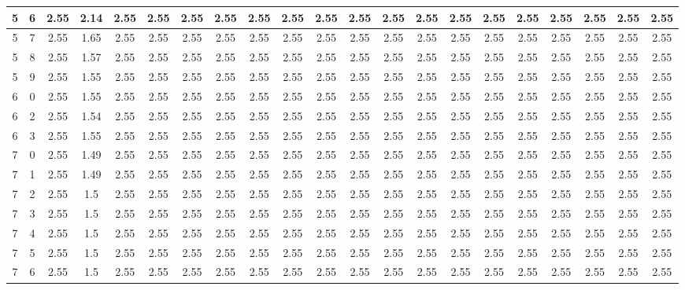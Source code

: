 \begin{landscape}
\begin{longtable}{|c|c||c||c|c|c|c|c|c|c|c|c||c|c|c|c|c|c|c|c|c|}
	5 & 6 & 2.55 & 2.14 & 2.55 & 2.55 & 2.55 & 2.55 & 2.55 & 2.55 & 2.55 & 2.55 & 2.55 & 2.55 & 2.55 & 2.55 & 2.55 & 2.55 & 2.55 & 2.55 & 2.55 \\ \hline
	5 & 7 & 2.55 & 1.65 & 2.55 & 2.55 & 2.55 & 2.55 & 2.55 & 2.55 & 2.55 & 2.55 & 2.55 & 2.55 & 2.55 & 2.55 & 2.55 & 2.55 & 2.55 & 2.55 & 2.55 \\ \hline
	5 & 8 & 2.55 & 1.57 & 2.55 & 2.55 & 2.55 & 2.55 & 2.55 & 2.55 & 2.55 & 2.55 & 2.55 & 2.55 & 2.55 & 2.55 & 2.55 & 2.55 & 2.55 & 2.55 & 2.55 \\ \hline
	5 & 9 & 2.55 & 1.55 & 2.55 & 2.55 & 2.55 & 2.55 & 2.55 & 2.55 & 2.55 & 2.55 & 2.55 & 2.55 & 2.55 & 2.55 & 2.55 & 2.55 & 2.55 & 2.55 & 2.55 \\ \hline
	6 & 0 & 2.55 & 1.55 & 2.55 & 2.55 & 2.55 & 2.55 & 2.55 & 2.55 & 2.55 & 2.55 & 2.55 & 2.55 & 2.55 & 2.55 & 2.55 & 2.55 & 2.55 & 2.55 & 2.55 \\ \hline
	6 & 2 & 2.55 & 1.54 & 2.55 & 2.55 & 2.55 & 2.55 & 2.55 & 2.55 & 2.55 & 2.55 & 2.55 & 2.55 & 2.55 & 2.55 & 2.55 & 2.55 & 2.55 & 2.55 & 2.55 \\ \hline
	6 & 3 & 2.55 & 1.55 & 2.55 & 2.55 & 2.55 & 2.55 & 2.55 & 2.55 & 2.55 & 2.55 & 2.55 & 2.55 & 2.55 & 2.55 & 2.55 & 2.55 & 2.55 & 2.55 & 2.55 \\ \hline
	7 & 0 & 2.55 & 1.49 & 2.55 & 2.55 & 2.55 & 2.55 & 2.55 & 2.55 & 2.55 & 2.55 & 2.55 & 2.55 & 2.55 & 2.55 & 2.55 & 2.55 & 2.55 & 2.55 & 2.55 \\ \hline
	7 & 1 & 2.55 & 1.49 & 2.55 & 2.55 & 2.55 & 2.55 & 2.55 & 2.55 & 2.55 & 2.55 & 2.55 & 2.55 & 2.55 & 2.55 & 2.55 & 2.55 & 2.55 & 2.55 & 2.55 \\ \hline
	7 & 2 & 2.55 & 1.5 & 2.55 & 2.55 & 2.55 & 2.55 & 2.55 & 2.55 & 2.55 & 2.55 & 2.55 & 2.55 & 2.55 & 2.55 & 2.55 & 2.55 & 2.55 & 2.55 & 2.55 \\ \hline
	7 & 3 & 2.55 & 1.5 & 2.55 & 2.55 & 2.55 & 2.55 & 2.55 & 2.55 & 2.55 & 2.55 & 2.55 & 2.55 & 2.55 & 2.55 & 2.55 & 2.55 & 2.55 & 2.55 & 2.55 \\ \hline
	7 & 4 & 2.55 & 1.5 & 2.55 & 2.55 & 2.55 & 2.55 & 2.55 & 2.55 & 2.55 & 2.55 & 2.55 & 2.55 & 2.55 & 2.55 & 2.55 & 2.55 & 2.55 & 2.55 & 2.55 \\ \hline
	7 & 5 & 2.55 & 1.5 & 2.55 & 2.55 & 2.55 & 2.55 & 2.55 & 2.55 & 2.55 & 2.55 & 2.55 & 2.55 & 2.55 & 2.55 & 2.55 & 2.55 & 2.55 & 2.55 & 2.55 \\ \hline
	7 & 6 & 2.55 & 1.5 & 2.55 & 2.55 & 2.55 & 2.55 & 2.55 & 2.55 & 2.55 & 2.55 & 2.55 & 2.55 & 2.55 & 2.55 & 2.55 & 2.55 & 2.55 & 2.55 & 2.55 \\ \hline

\end{longtable}
\end{landscape}
